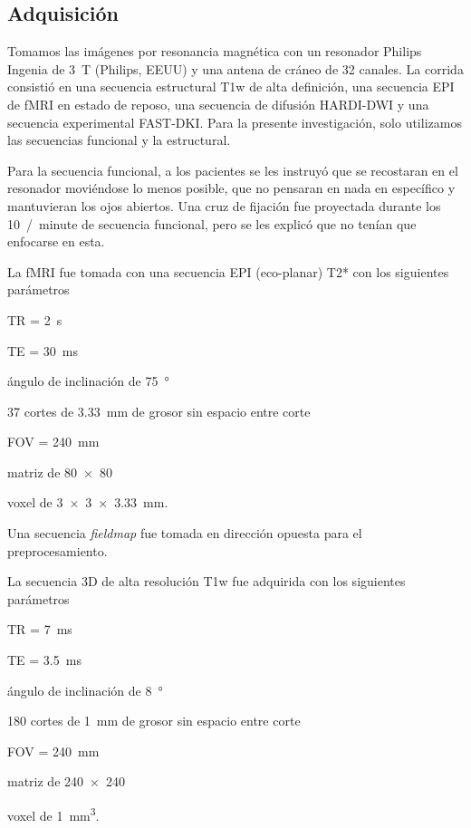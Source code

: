 \subsection{Adquisición}
Tomamos las imágenes por resonancia magnética con un resonador Philips Ingenia de \SI{3}{\tesla} (Philips, EEUU) y una antena de cráneo de 32 canales. La corrida consistió en una secuencia estructural T1w de alta definición, una secuencia EPI de fMRI en estado de reposo, una secuencia de difusión HARDI-DWI y una secuencia experimental FAST-DKI. Para la presente investigación, solo utilizamos las secuencias funcional y la estructural.\par
Para la secuencia funcional, a los pacientes se les instruyó que se recostaran en el resonador moviéndose lo menos posible, que no pensaran en nada en específico y mantuvieran los ojos abiertos. Una cruz de fijación fue proyectada durante los \SI{10}{/minute} de secuencia funcional, pero se les explicó que no tenían que enfocarse en esta. \par
La fMRI fue tomada con una secuencia EPI (eco-planar) T2* con los siguientes parámetros
\begin{enumerate*}[label=\emph{\alph*}), before=\unskip{: }, itemjoin={{; }}, itemjoin*={{, y }}]
    \item TR = \SI{2}{\second}
    \item TE = \SI{30}{\milli\second}
    \item ángulo de inclinación de \SI{75}{\degree}
    \item 37 cortes de \SI{3.33}{\milli\meter} de grosor sin espacio entre corte
    \item FOV = \SI{240}{\milli\meter}
    \item matriz de \num{80x80}
    \item voxel de \SI[product-units=single]{3x3x3.33}{\milli\meter}.
\end{enumerate*}
Una secuencia \textit{fieldmap} fue tomada en dirección opuesta para el preprocesamiento.\par
La secuencia 3D de alta resolución T1w fue adquirida con los siguientes parámetros
\begin{enumerate*}[label=\emph{\alph*}), before=\unskip{: }, itemjoin={{; }}, itemjoin*={{, y }}]
    \item TR = \SI{7}{\milli\second}
    \item TE = \SI{3.5}{\milli\second}
    \item ángulo de inclinación de \SI{8}{\degree}
    \item 180 cortes de \SI{1}{\milli\meter} de grosor sin espacio entre corte
    \item FOV = \SI{240}{\milli\meter}
    \item matriz de \num{240x240}
    \item voxel de \SI[product-units=single]{1}{\milli\meter\cubed}.
\end{enumerate*}

